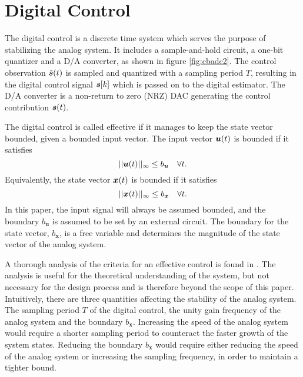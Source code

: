 \section{Digital Control}
The digital control is a discrete time system which serves the purpose of stabilizing the analog system. It includes a sample-and-hold circuit, a one-bit quantizer and a D/A converter, as shown in figure \ref{fig:cbadc2}. The control observation $\tilde{\bm{s}}(t)$ is sampled and quantized with a sampling period $T$, resulting in the digital control signal $\bm{s}[k]$ which is passed on to the digital estimator. The D/A converter is a non-return to zero (NRZ) DAC generating the control contribution $\bm{s}(t)$.

The digital control is called effective if it manages to keep the state vector bounded, given a bounded input vector. The input vector $\bm{u}(t)$ is bounded if it satisfies
\begin{equation}
    ||\bm{u}(t)||_{\infty} \leq b_{\bm{u}} \quad \forall t.
\end{equation}
Equivalently, the state vector $\bm{x}(t)$ is bounded if it satisfies
\begin{equation}
    \label{eq:bx}
    ||\bm{x}(t)||_{\infty} \leq b_{\bm{x}} \quad \forall t.
\end{equation}
In this paper, the input signal will always be assumed bounded, and the boundary $b_{\bm{u}}$ is assumed to be set by an external circuit. The boundary for the state vector, $b_{\bm{x}}$, is a free variable and determines the magnitude of the state vector of the analog system.

A thorough analysis of the criteria for an effective control is found in \cite{malmberg_thesis}. The analysis is useful for the theoretical understanding of the system, but not necessary for the design process and is therefore beyond the scope of this paper. Intuitively, there are three quantities affecting the stability of the analog system. The sampling period $T$ of the digital control, the unity gain frequency of the analog system and the boundary $b_{\bm{x}}$. Increasing the speed of the analog system would require a shorter sampling period to counteract the faster growth of the system states. Reducing the boundary  $b_{\bm{x}}$ would require either reducing the speed of the analog system or increasing the sampling frequency, in order to maintain a tighter bound.


